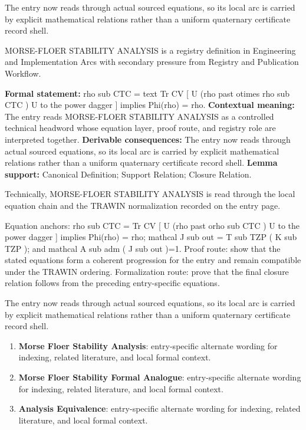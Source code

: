 The entry now reads through actual sourced equations, so its local arc is carried by explicit mathematical relations rather than a uniform quaternary certificate record shell.
\clearpage


\begingroup\small
{}
MORSE-FLOER STABILITY ANALYSIS is a registry definition in Engineering and Implementation Arcs with secondary pressure from Registry and Publication Workflow.

\begingroup\footnotesize\setlength{\emergencystretch}{3em}\sloppy
\textbf{Formal statement:} rho sub CTC = text Tr CV [ U (rho past otimes rho sub CTC ) U to the power dagger ] implies Phi(rho) = rho. \textbf{Contextual meaning:} The entry reads MORSE-FLOER STABILITY ANALYSIS as a controlled technical headword whose equation layer, proof route, and registry role are interpreted together. \textbf{Derivable consequences:} The entry now reads through actual sourced equations, so its local arc is carried by explicit mathematical relations rather than a uniform quaternary certificate record shell. \textbf{Lemma support:} Canonical Definition; Support Relation; Closure Relation.\par
\endgroup

Technically, MORSE-FLOER STABILITY ANALYSIS is read through the local equation chain and the TRAWIN normalization recorded on the entry page.

Equation anchors: rho sub CTC = Tr CV [ U (rho past orho sub CTC ) U to the power dagger ] implies Phi(rho) = rho; mathcal J sub out = T sub TZP ( K sub TZP ); and mathcal A sub adm ( J sub out )=1. Proof route: show that the stated equations form a coherent progression for the entry and remain compatible under the TRAWIN ordering. Formalization route: prove that the final closure relation follows from the preceding entry-specific equations.

The entry now reads through actual sourced equations, so its local arc is carried by explicit mathematical relations rather than a uniform quaternary certificate record shell.
\endgroup

\begin{enumerate}[leftmargin=1.6em,itemsep=6pt,topsep=4pt]
\item \textbf{Morse Floer Stability Analysis}: entry-specific alternate wording for indexing, related literature, and local formal context.
\item \textbf{Morse Floer Stability Formal Analogue}: entry-specific alternate wording for indexing, related literature, and local formal context.
\item \textbf{Analysis Equivalence}: entry-specific alternate wording for indexing, related literature, and local formal context.
\end{enumerate}


